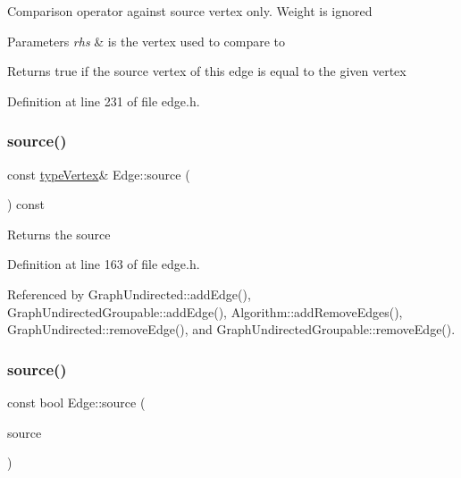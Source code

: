 Comparison operator against source vertex only. Weight is ignored 
\begin{DoxyParams}{Parameters}
{\em rhs} & is the vertex used to compare to \\
\hline
\end{DoxyParams}
\begin{DoxyReturn}{Returns}
true if the source vertex of this edge is equal to the given vertex 
\end{DoxyReturn}


Definition at line 231 of file edge.\+h.

\mbox{\label{classEdge_ad949d0cbd81ca43e8043b066b0d167d3}} 
\subsubsection{\texorpdfstring{source()}{source()}\hspace{0.1cm}{\footnotesize\ttfamily [1/2]}}
{\footnotesize\ttfamily const \hyperlink{edge_8h_a5fbd20c46956d479cb10afc9855223f6}{type\+Vertex}\& Edge\+::source (\begin{DoxyParamCaption}{ }\end{DoxyParamCaption}) const\hspace{0.3cm}{\ttfamily [inline]}}

\begin{DoxyReturn}{Returns}
the source 
\end{DoxyReturn}


Definition at line 163 of file edge.\+h.



Referenced by Graph\+Undirected\+::add\+Edge(), Graph\+Undirected\+Groupable\+::add\+Edge(), Algorithm\+::add\+Remove\+Edges(), Graph\+Undirected\+::remove\+Edge(), and Graph\+Undirected\+Groupable\+::remove\+Edge().

\mbox{\label{classEdge_a2e5c29247138f730c3ca13cc0220b97c}} 
\subsubsection{\texorpdfstring{source()}{source()}\hspace{0.1cm}{\footnotesize\ttfamily [2/2]}}
{\footnotesize\ttfamily const bool Edge\+::source (\begin{DoxyParamCaption}\item[{const \hyperlink{edge_8h_a5fbd20c46956d479cb10afc9855223f6}{type\+Vertex} \&}]{source }\end{DoxyParamCaption})\hspace{0.3cm}{\ttfamily [inline]}}

